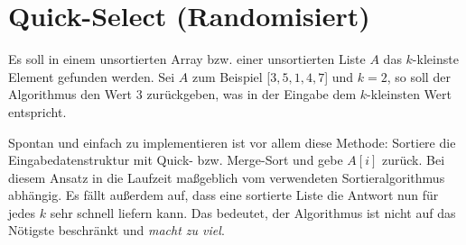 \documentclass{scrartcl}%
\begin{document}

    \section*{Quick-Select (Randomisiert)}\label{sec:quick-select}
    Es soll in einem unsortierten Array bzw. einer unsortierten Liste $A$ das $k$-kleinste Element gefunden werden.
    Sei $A$ zum Beispiel [$3,5,1,4,7$] und $k=2$, so soll der Algorithmus den Wert $3$ zurückgeben, was in der Eingabe dem $k$-kleinsten Wert entspricht.

    Spontan und einfach zu implementieren ist vor allem diese Methode: Sortiere die Eingabedatenstruktur mit Quick- bzw.
    Merge-Sort und gebe $A[i]$ zurück.
    Bei diesem Ansatz in die Laufzeit maßgeblich vom verwendeten Sortieralgorithmus abhängig.
    Es fällt außerdem auf, dass eine sortierte Liste die Antwort nun für jedes $k$ sehr schnell liefern kann.
    Das bedeutet, der Algorithmus ist nicht auf das Nötigste beschränkt und \textit{macht zu viel}.
\end{document}
